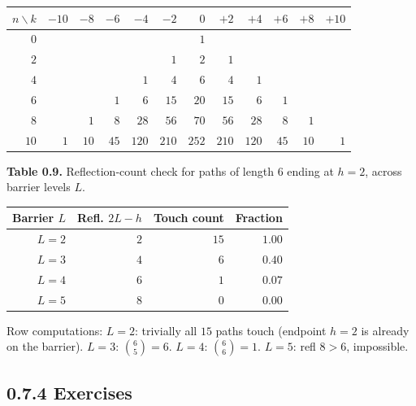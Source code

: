 \documentclass[
  10pt,
  twoside]{book}
\newcounter{none} %
\begin{document}
{\def\LTcaptype{none} %
\begin{table}[H]
\centering
\begin{tabular}{|r|r|r|r|r|r|r|r|r|r|r|r|}
\toprule
\(n \backslash k\) & \(-10\) & \(-8\) & \(-6\) & \(-4\) & \(-2\) & \(0\) & \(+2\) & \(+4\) & \(+6\) & \(+8\) & \(+10\) \\
\midrule



\(0\) & & & & & & \(1\) & & & & & \\
\(2\) & & & & & \(1\) & \(2\) & \(1\) & & & & \\
\(4\) & & & & \(1\) & \(4\) & \(6\) & \(4\) & \(1\) & & & \\
\(6\) & & & \(1\) & \(6\) & \(15\) & \(20\) & \(15\) & \(6\) & \(1\) &
& \\
\(8\) & & \(1\) & \(8\) & \(28\) & \(56\) & \(70\) & \(56\) & \(28\) &
\(8\) & \(1\) & \\
\(10\) & \(1\) & \(10\) & \(45\) & \(120\) & \(210\) & \(252\) & \(210\)
& \(120\) & \(45\) & \(10\) & \(1\) \\
\bottomrule
\end{tabular}
\end{table}
}

\textbf{Table 0.9.} Reflection-count check for paths of length \(6\)
ending at \(h = 2\), across barrier levels \(L\).

{\def\LTcaptype{none} %
\begin{table}[H]
\centering
\begin{tabular}{|r|r|r|r|}
\toprule
Barrier \(L\) & Refl. \(2L - h\) & Touch count & Fraction \\
\midrule



\(L = 2\) & \(2\) & \(15\) & \(1.00\) \\
\(L = 3\) & \(4\) & \(6\) & \(0.40\) \\
\(L = 4\) & \(6\) & \(1\) & \(0.07\) \\
\(L = 5\) & \(8\) & \(0\) & \(0.00\) \\
\bottomrule
\end{tabular}
\end{table}
}

Row computations: \(L=2\): trivially all \(15\) paths touch (endpoint
\(h=2\) is already on the barrier). \(L=3\): \(\binom{6}{5}=6\).
\(L=4\): \(\binom{6}{6}=1\). \(L=5\): refl \(8 > 6\), impossible.

\subsection{0.7.4 Exercises}\label{exercises-6}
\end{document}
